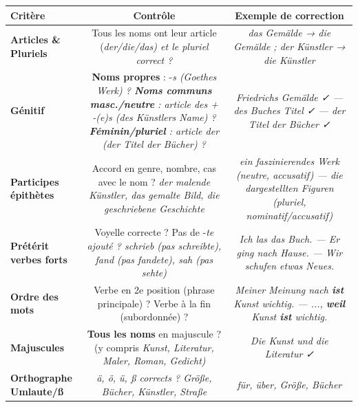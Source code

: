 \documentclass[11pt]{article}
\newcommand{\all}[1]{\ifmmode\text{\textit{#1}}\else\begingroup\selectlanguage{ngerman}\itshape #1\endgroup\fi}
\begin{document}
\begin{aretenir}
\begin{center}
\begin{tabular}{|l|c|c|}\hline
\rowcolor{popblueL} \textbf{Critère} & \textbf{Contrôle} & \textbf{Exemple de correction} \\ \hline
\textbf{Articles \& Pluriels} & Tous les noms ont leur article (\all{der/die/das}) et le pluriel correct ? & \all{das Gemälde} → \all{die Gemälde} ; \all{der Künstler} → \all{die Künstler} \\ \hline
\textbf{Génitif} & \textbf{Noms propres} : -\all{s} (\all{Goethes Werk}) ? \textbf{Noms communs masc./neutre} : article \all{des} + -\all{(e)s} (\all{des Künstlers Name}) ? \textbf{Féminin/pluriel} : article \all{der} (\all{der Titel der Bücher}) ? & \all{Friedrichs Gemälde} ✓ — \all{des Buches Titel} ✓ — \all{der Titel der Bücher} ✓ \\ \hline
\textbf{Participes épithètes} & Accord en genre, nombre, cas avec le nom ? \all{der malende Künstler}, \all{das gemalte Bild}, \all{die geschriebene Geschichte} & \all{ein faszinierendes Werk} (neutre, accusatif) — \all{die dargestellten Figuren} (pluriel, nominatif/accusatif) \\ \hline
\textbf{Prétérit verbes forts} & Voyelle correcte ? Pas de -\all{te} ajouté ? \all{schrieb} (pas \all{schreibte}), \all{fand} (pas \all{fandete}), \all{sah} (pas \all{sehte}) & \all{Ich las das Buch.} — \all{Er ging nach Hause.} — \all{Wir schufen etwas Neues.} \\ \hline
\textbf{Ordre des mots} & Verbe en 2e position (phrase principale) ? Verbe à la fin (subordonnée) ? & \all{Meiner Meinung nach \textbf{ist} Kunst wichtig.} — \all{..., \textbf{weil} Kunst \textbf{ist} wichtig.} \\ \hline
\textbf{Majuscules} & \textbf{Tous les noms} en majuscule ? (y compris \all{Kunst, Literatur, Maler, Roman, Gedicht}) & \all{Die Kunst und die Literatur} ✓ \\ \hline
\textbf{Orthographe Umlaute/ß} & \all{ä, ö, ü, ß} corrects ? \all{Größe, Bücher, Künstler, Straße} & \all{für, über, Größe, Bücher} \\ \hline
\end{tabular}
\end{center}
\end{aretenir}
\end{document}
